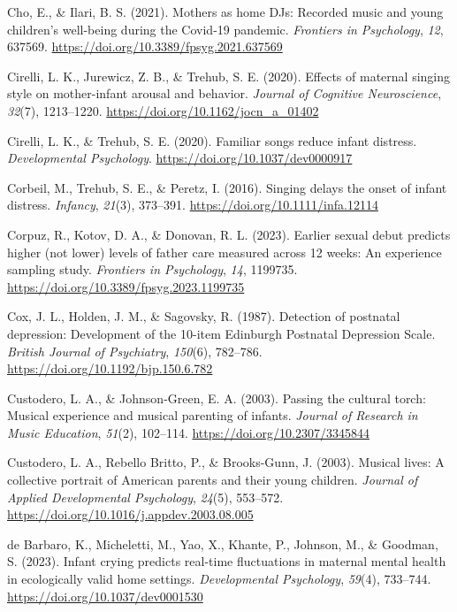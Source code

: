 \documentclass[
]{article}
\newlength{\cslhangindent}
\newenvironment{CSLReferences}[2] %
 {\begin{list}{}{%
  \setlength{\itemindent}{0pt}
  \setlength{\leftmargin}{0pt}
  \setlength{\parsep}{0pt}
  \ifodd #1
   \setlength{\leftmargin}{\cslhangindent}
   \setlength{\itemindent}{-1\cslhangindent}
  \fi
  \setlength{\itemsep}{#2\baselineskip}}}
 {\end{list}}
\begin{document}
\begin{CSLReferences}{1}{0}
Cho, E., \& Ilari, B. S. (2021). Mothers as home {DJs}: {Recorded} music
and young children's well-being during the {Covid-19} pandemic.
\emph{Frontiers in Psychology}, \emph{12}, 637569.
\url{https://doi.org/10.3389/fpsyg.2021.637569}

Cirelli, L. K., Jurewicz, Z. B., \& Trehub, S. E. (2020). Effects of
maternal singing style on mother-infant arousal and behavior.
\emph{Journal of Cognitive Neuroscience}, \emph{32}(7), 1213--1220.
\url{https://doi.org/10.1162/jocn_a_01402}

Cirelli, L. K., \& Trehub, S. E. (2020). Familiar songs reduce infant
distress. \emph{Developmental Psychology}.
\url{https://doi.org/10.1037/dev0000917}

Corbeil, M., Trehub, S. E., \& Peretz, I. (2016). Singing delays the
onset of infant distress. \emph{Infancy}, \emph{21}(3), 373--391.
\url{https://doi.org/10.1111/infa.12114}

Corpuz, R., Kotov, D. A., \& Donovan, R. L. (2023). Earlier sexual debut
predicts higher (not lower) levels of father care measured across 12
weeks: An experience sampling study. \emph{Frontiers in Psychology},
\emph{14}, 1199735. \url{https://doi.org/10.3389/fpsyg.2023.1199735}

Cox, J. L., Holden, J. M., \& Sagovsky, R. (1987). Detection of
postnatal depression: {Development} of the 10-item {Edinburgh Postnatal
Depression Scale}. \emph{British Journal of Psychiatry}, \emph{150}(6),
782--786. \url{https://doi.org/10.1192/bjp.150.6.782}

Custodero, L. A., \& Johnson-Green, E. A. (2003). Passing the cultural
torch: {Musical} experience and musical parenting of infants.
\emph{Journal of Research in Music Education}, \emph{51}(2), 102--114.
\url{https://doi.org/10.2307/3345844}

Custodero, L. A., Rebello Britto, P., \& Brooks-Gunn, J. (2003). Musical
lives: {A} collective portrait of {American} parents and their young
children. \emph{Journal of Applied Developmental Psychology},
\emph{24}(5), 553--572.
\url{https://doi.org/10.1016/j.appdev.2003.08.005}

de Barbaro, K., Micheletti, M., Yao, X., Khante, P., Johnson, M., \&
Goodman, S. (2023). Infant crying predicts real-time fluctuations in
maternal mental health in ecologically valid home settings.
\emph{Developmental Psychology}, \emph{59}(4), 733--744.
\url{https://doi.org/10.1037/dev0001530}


\end{CSLReferences}
\end{document}

